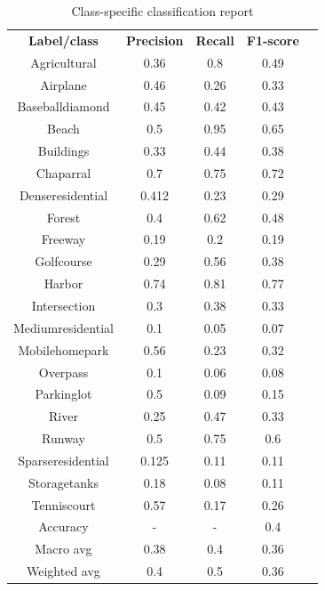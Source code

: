 \documentclass[oneside,twocolumn,10pt,cleanfoot,cleanhead]{asme2ej}
\begin{document}
\begin{table}[ht]
    \caption{Class-specific classification report}
    \begin{center}
        \label{tab:class_report}
        \begin{tabular}{c c c c c}
            & & \\
            \hline
            \textbf{Label/class} & \textbf{Precision} & \textbf{Recall} & \textbf{F1-score} \\
            \hline
            Agricultural & 0.36 & 0.8 & 0.49 \\
            Airplane & 0.46 & 0.26 & 0.33 \\ 
            Baseballdiamond & 0.45 & 0.42 & 0.43 \\
            Beach & 0.5 & 0.95 & 0.65 \\
            Buildings & 0.33 & 0.44 & 0.38 \\
            Chaparral & 0.7 & 0.75 & 0.72 \\
            Denseresidential & 0.412 & 0.23 & 0.29 \\
            Forest & 0.4 & 0.62 & 0.48 \\
            Freeway & 0.19 & 0.2 & 0.19 \\
            Golfcourse & 0.29 & 0.56 & 0.38 \\
            Harbor & 0.74 & 0.81 & 0.77 \\
            Intersection & 0.3 & 0.38 & 0.33\\
            Mediumresidential & 0.1 & 0.05 & 0.07 \\
            Mobilehomepark & 0.56 & 0.23 & 0.32 \\
            Overpass & 0.1 & 0.06 & 0.08 \\
            Parkinglot & 0.5 & 0.09 & 0.15 \\
            River & 0.25 & 0.47 & 0.33 \\
            Runway & 0.5 & 0.75 & 0.6 \\
            Sparseresidential & 0.125 & 0.11 & 0.11 \\
            Storagetanks & 0.18 & 0.08 & 0.11 \\
            Tenniscourt & 0.57 & 0.17 & 0.26 \\
            \hline
            Accuracy & - & - & 0.4 \\
            Macro avg & 0.38 & 0.4 & 0.36 \\ 
            Weighted avg & 0.4 & 0.5 & 0.36 \\
            \hline
        \end{tabular}
    \end{center}
\end{table}
\end{document}
